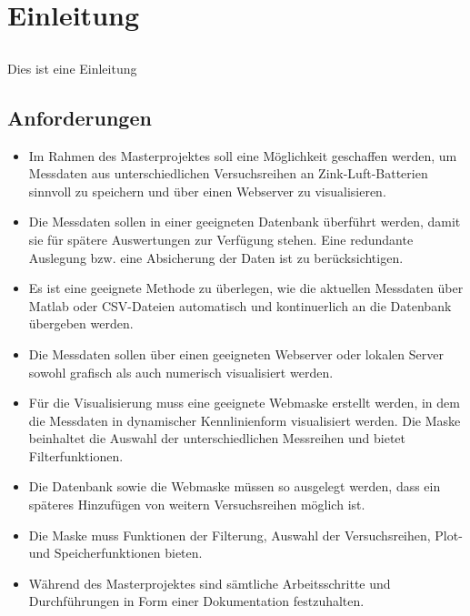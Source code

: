 \chapter{Einleitung}\label{ch:einleitung}

\section{}

Dies ist eine Einleitung

\section{Anforderungen}

\begin{itemize}

\item Im Rahmen des Masterprojektes soll eine Möglichkeit geschaffen werden, um Messdaten aus unterschiedlichen Versuchsreihen an Zink-Luft-Batterien sinnvoll zu speichern und über einen Webserver zu visualisieren.

\item Die Messdaten sollen in einer geeigneten Datenbank überführt werden, damit sie für spätere Auswertungen zur Verfügung stehen. Eine redundante Auslegung bzw. eine Absicherung der Daten ist zu berücksichtigen.

\item Es ist eine geeignete Methode zu überlegen, wie die aktuellen Messdaten über Matlab oder CSV-Dateien automatisch und kontinuerlich an die Datenbank übergeben werden.

\item Die Messdaten sollen über einen geeigneten Webserver oder lokalen Server sowohl grafisch als auch numerisch visualisiert werden.

\item Für die Visualisierung muss eine geeignete Webmaske erstellt werden, in dem die Messdaten in dynamischer Kennlinienform visualisiert werden. Die Maske beinhaltet die Auswahl der unterschiedlichen Messreihen und bietet Filterfunktionen.

\item Die Datenbank sowie die Webmaske müssen so ausgelegt werden, dass ein späteres Hinzufügen von weitern Versuchsreihen möglich ist.

\item  Die Maske muss Funktionen der Filterung, Auswahl der Versuchsreihen, Plot- und Speicherfunktionen bieten.

\item Während des Masterprojektes sind sämtliche Arbeitsschritte und Durchführungen in Form einer Dokumentation festzuhalten.

\end{itemize}
